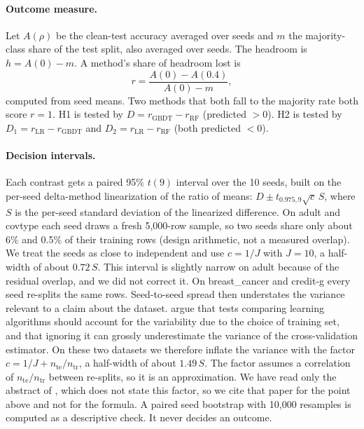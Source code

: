\documentclass[11pt]{article}
\newcommand{\ds}[1]{\textsf{#1}}
\newcommand{\bc}{\ds{breast\_cancer}}
\newcommand{\cg}{\ds{credit-g}}
\newcommand{\ad}{\ds{adult}}
\newcommand{\ct}{\ds{covtype}}
\begin{document}
\paragraph{Outcome measure.} Let $A(\rho)$ be the clean-test accuracy averaged over seeds
and $m$ the majority-class share of the test split, also averaged over seeds. The headroom
is $h = A(0) - m$. A method's share of headroom lost is
\[
  r = \frac{A(0) - A(0.4)}{A(0) - m},
\]
computed from seed means. Two methods that both fall to the majority rate both score
$r=1$. H1 is tested by $D = r_{\mathrm{GBDT}} - r_{\mathrm{RF}}$ (predicted $>0$). H2 is
tested by $D_1 = r_{\mathrm{LR}} - r_{\mathrm{GBDT}}$ and
$D_2 = r_{\mathrm{LR}} - r_{\mathrm{RF}}$ (both predicted $<0$).

\paragraph{Decision intervals.} Each contrast gets a paired 95\% $t(9)$ interval over the 10
seeds, built on the per-seed delta-method linearization of the ratio of means:
$D \pm t_{0.975,9}\sqrt{c}\,S$, where $S$ is the per-seed standard deviation of the
linearized difference. On \ad{} and \ct{} each seed draws a fresh 5,000-row sample, so two
seeds share only about 6\% and 0.5\% of their training rows (design arithmetic, not a
measured overlap). We treat the seeds as close to
independent and use $c = 1/J$ with $J=10$, a half-width of about $0.72\,S$. This interval is
slightly narrow on \ad{} because of the residual overlap, and we did not correct it. On \bc{}
and \cg{} every seed re-splits the same rows. Seed-to-seed spread then understates the
variance relevant to a claim about the dataset. \citet{nadeau2003} argue that tests
comparing learning algorithms should account for the variability due to the choice of
training set, and that ignoring it can grossly underestimate the variance of the
cross-validation estimator. On these two datasets we therefore inflate the variance with
the factor $c = 1/J + n_{\mathrm{te}}/n_{\mathrm{tr}}$, a half-width of about $1.49\,S$. The
factor assumes a correlation of $n_{\mathrm{te}}/n_{\mathrm{tr}}$ between re-splits, so it is
an approximation. We have read only the abstract of \citet{nadeau2003}, which does not
state this factor, so we cite that paper for the point above and not for the formula. A
paired seed bootstrap with 10,000 resamples is computed as a descriptive check. It never
decides an outcome.
\end{document}
